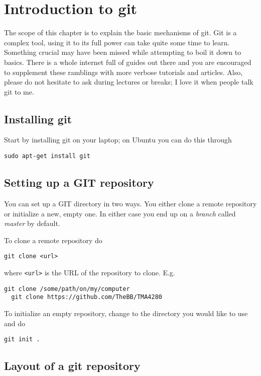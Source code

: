 \chapter{Introduction to git}

The scope of this chapter is to explain the basic mechanisms of git. Git is a
complex tool, using it to its full power can take quite some time to learn.
Something crucial may have been missed while attempting to boil it down to
basics. There is a whole internet full of guides out there and you are
encouraged to supplement these ramblings with more verbose tutorials and
articles. Also, please do not hesitate to ask during lectures or breaks; I love
it when people talk git to me.

\section{Installing git}

Start by installing git on your laptop; on Ubuntu you can do this through
\begin{lstlisting}[style=shell]
  sudo apt-get install git
\end{lstlisting}

\section{Setting up a GIT repository}

You can set up a GIT directory in two ways. You either clone a remote repository
or initialize a new, empty one. In either case you end up on a \emph{branch}
called \emph{master} by default.

To clone a remote repository do
\begin{lstlisting}[style=shell]
  git clone <url>
\end{lstlisting}
where \texttt{<url>} is the URL of the repository to clone. E.g.
\begin{lstlisting}[style=shell]
  git clone /some/path/on/my/computer
  git clone https://github.com/TheBB/TMA4280
\end{lstlisting}
To initialize an empty repository, change to the directory you would like to use
and do
\begin{lstlisting}[style=shell]
  git init .
\end{lstlisting}

\section{Layout of a git repository}

